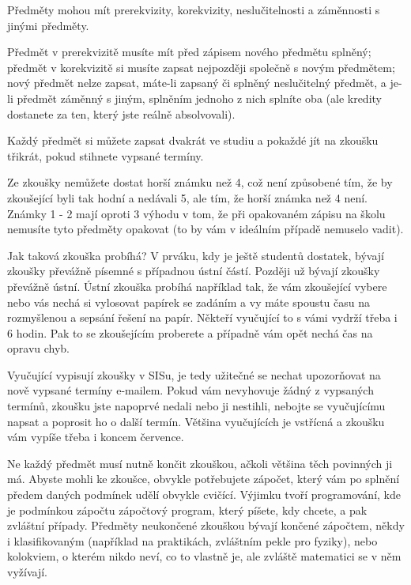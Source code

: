 Předměty mohou mít prerekvizity, korekvizity, neslučitelnosti a záměnnosti s jinými předměty.

Předmět v prerekvizitě musíte mít před zápisem nového předmětu splněný; předmět v korekvizitě si musíte zapsat
nejpozději společně s novým předmětem; nový předmět nelze zapsat, máte-li zapsaný či splněný neslučitelný předmět, a
je-li předmět záměnný s jiným, splněním jednoho z nich splníte oba (ale kredity dostanete za ten, který jste reálně
absolvovali).




Každý předmět si můžete zapsat dvakrát ve studiu a pokaždé jít na zkoušku třikrát, pokud stihnete vypsané termíny.

Ze zkoušky nemůžete dostat horší známku než 4, což není způsobené tím, že by zkoušející byli tak hodní a nedávali 5, ale
tím, že horší známka než 4 není. Známky 1 - 2 mají oproti 3 výhodu v tom, že při opakovaném zápisu na školu nemusíte
tyto předměty opakovat (to by vám v ideálním případě nemuselo vadit).

Jak taková zkouška probíhá? V prváku, kdy je ještě studentů dostatek, bývají zkoušky převážně písemné s případnou ústní
částí. Později už bývají zkoušky převážně ústní. Ústní zkouška probíhá například tak, že vám zkoušející vybere nebo vás
nechá si vylosovat papírek se zadáním a vy máte spoustu času na rozmyšlenou a sepsání řešení na papír. Někteří vyučující
to s vámi vydrží třeba i 6 hodin. Pak to se zkoušejícím proberete a případně vám opět nechá čas na opravu chyb.

Vyučující vypisují zkoušky v SISu, je tedy užitečné se nechat upozorňovat na nově vypsané termíny e-mailem. Pokud vám
nevyhovuje žádný z vypsaných termínů, zkoušku jste napoprvé nedali nebo ji nestihli, nebojte se vyučujícímu napsat a
poprosit ho o další termín. Většina vyučujících je vstřícná a zkoušku vám vypíše třeba i koncem července.

Ne každý předmět musí nutně končit zkouškou, ačkoli většina těch povinných ji má. Abyste mohli ke zkoušce, obvykle
potřebujete zápočet, který vám po splnění předem daných podmínek udělí obvykle cvičící. Výjimku tvoří programování, kde
je podmínkou zápočtu zápočtový program, který píšete, kdy chcete, a pak zvláštní případy. Předměty neukončené zkouškou
bývají končené zápočtem, někdy i klasifikovaným (například na praktikách, zvláštním pekle pro fyziky), nebo kolokviem, o
kterém nikdo neví, co to vlastně je, ale zvláště matematici se v něm vyžívají.

